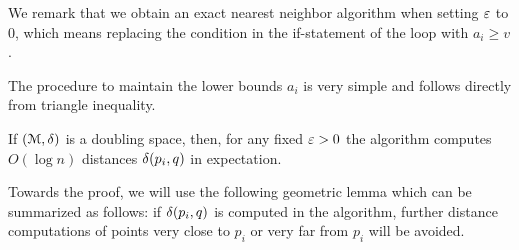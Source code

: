\documentclass[a4paper,UKenglish,cleveref, autoref]{lipics-v2019}
\begin{document}
We remark that we obtain an exact nearest neighbor algorithm
when setting $\varepsilon$ to $0$, which means 
replacing the condition in the if-statement of the loop
with $a_i\geq v$.

The procedure to maintain the lower bounds $a_i$
is very simple and follows directly
from triangle inequality.

\begin{algorithmic}
    \EndFor
\EndProcedure
\end{algorithmic}

\begin{theorem}
\label{thm:ann_bound}
    If $(\mathcal{M}, \delta)$ is a doubling space, then, for any fixed $\varepsilon > 0$ the
    algorithm computes $O(\log n)$ distances $\delta(p_i, q)$ in expectation.
\end{theorem}

Towards the proof, we will use the following geometric lemma which
can be summarized as follows: if $\delta(p_i,q)$ is computed in the algorithm,
further distance computations of points very close to $p_i$ or very far from $p_i$
will be avoided.
\end{document}
